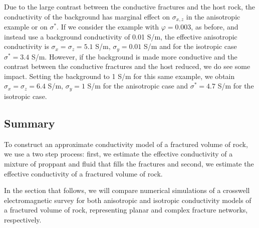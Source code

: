 Due to the large contrast between the conductive fractures and the host rock, the conductivity of the background has marginal effect on $\sigma_{x, z}$ in the anisotropic example or on $\sigma^*$. If we consider the example with $\varphi = 0.003$, as before, and instead use a background conductivity of 0.01 S/m, the effective anisotropic conductivity is $\sigma_x = \sigma_z = 5.1$ S/m, $\sigma_y = 0.01$ S/m and for the isotropic case $\sigma^* = 3.4$ S/m. However, if the background is made more conductive and the contrast between the conductive fractures and the host reduced, we do see some impact. Setting the background to 1 S/m for this same example, we obtain $\sigma_x = \sigma_z = 6.4$ S/m, $\sigma_y = 1$ S/m for the anisotropic case and $\sigma^* = 4.7$ S/m for the isotropic case.


\subsection{Summary}
To construct an approximate conductivity model of a fractured volume of rock, we use a two step process: first, we estimate the effective conductivity of a mixture of proppant and fluid that fills the fractures and second, we estimate the effective conductivity of a fractured volume of rock.

In the section that follows, we will compare numerical simulations of a crosswell electromagnetic survey for both anisotropic and isotropic conductivity models of a fractured volume of rock, representing planar and complex fracture networks, respectively.

